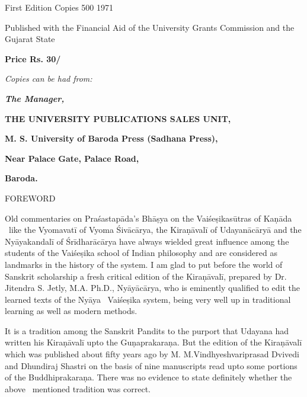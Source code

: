 \documentclass[11pt, openany]{book}
\begin{document}
\newpage
\thispagestyle{empty}
\noindent
First Edition
Copies 500
1971

\begin{center}
Published with the Financial Aid of the University Grants Commission
and the Gujarat State

\vspace{2cm}
\textbf{Price Rs. 30/ \textendash\ }
\end{center}

\vspace{2cm}
\noindent
\textit{\en Copies can be had from:\textendash}

\begin{center}
\textit{\textbf{\en The Manager,}}

\textbf{THE UNIVERSITY PUBLICATIONS SALES UNIT,}

\textbf{M. S. University of Baroda Press (Sadhana Press),}

\textbf{Near Palace Gate, Palace Road,}

\textbf{Baroda.}
\end{center}


\newpage
\thispagestyle{empty}
\begin{center}
{\Large FOREWORD}
\end{center}

Old commentaries on Praśastapāda's Bhāṣya on the Vaiśeṣikasūtras of Kaṇāda \textendash\ like the Vyomavatī of Vyoma Śivācārya, the Kiraṇāvalī of Udayanācāryā and the Nyāyakandalī of Śrīdharācārya have always wielded great influence among the students of the Vaiśeṣika school of Indian philosophy and are considered as landmarks in the history of the system. I am glad to put before the world of Sanskrit scholarship a fresh critical edition of the Kiraṇāvalī, prepared by Dr. Jitendra S. Jetly, M.A. Ph.D., Nyāyācārya, who is eminently qualified to edit the learned texts of the Nyāya \textendash\ Vaiśeṣika system, being very well up in traditional learning as well as modern methods.

It is a tradition among the Sanskrit Pandits to the purport that Udayana had written his Kiraṇāvalī upto the Guṇaprakaraṇa. But the edition of the Kiraṇāvalī which was published about fifty years ago by M. M.Vindhyeshvariprasad Dvivedi and Dhundiraj Shastri on the basis of nine manuscripts read upto some portions of the Buddhiprakaraṇa. There was no evidence to state definitely whether the above \textendash\ mentioned tradition was correct.
\end{document}
